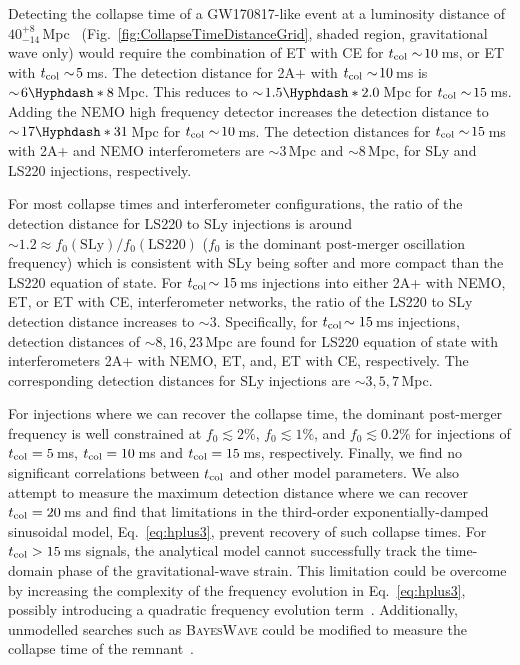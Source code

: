 \documentclass[../Thesis.tex]{subfiles}
\begin{document}
    Detecting the collapse time of a GW170817-like event at a luminosity distance of $40^{+8}_{-14}$\,Mpc~\cite{GW170817multi} (Fig.~\ref{fig:CollapseTimeDistanceGrid}, shaded region, gravitational wave only) would require the combination of ET with CE for $t_{\mathrm{col}} \sim\!10$\,ms,  or ET with $t_{\mathrm{col}} \sim\!5$\,ms. 
    The detection distance for 2A+ with  $t_{\mathrm{col}}\sim\!10$\,ms is $\sim\!6\Hyphdash*8$\,Mpc.  
    This reduces to $\sim\!1.5\Hyphdash*2.0$\,Mpc for $t_{\mathrm{col}} \sim\!15$\,ms. 
    Adding the NEMO high frequency detector increases the detection distance to $\sim\!17\Hyphdash*31$\,Mpc  for $t_{\mathrm{col}} \sim\!10$\,ms.
    The detection distances for $t_{\mathrm{col}}\sim\!15$\,ms with 2A+ and NEMO interferometers are $\sim\!3$\,Mpc and $\sim\!8$\,Mpc, for SLy and LS220 injections, respectively.\par
    
    
    For most collapse times and interferometer configurations, the ratio of the detection distance for LS220 to SLy injections is around $\sim\!1.2\approx f_0(\mathrm{SLy}) / f_0(\mathrm{LS220})$ ($f_0$ is the dominant post-merger oscillation frequency) which is consistent with SLy being softer and more compact than the LS220 equation of state. 
    For $t_{\mathrm{col}}\!\sim15$\,ms injections into either 2A+ with NEMO, ET, or ET with CE, interferometer networks, the ratio of the LS220 to SLy detection distance increases to $\sim\!3$.
    Specifically, for $t_{\mathrm{col}}\!\sim15$\,ms injections, detection distances of $\sim\!8,16,23$\,Mpc are found for LS220 equation of state with interferometers 2A+ with NEMO, ET, and, ET with CE, respectively.
    The corresponding detection distances for SLy injections are $\sim\!3,5,7$\,Mpc. 
    \par
    For injections where we can recover the collapse time, the dominant post-merger frequency is well constrained at $f_0 \lesssim 2\%$, $f_0 \lesssim 1\%$, and $f_0 \lesssim 0.2\%$ for injections of $t_{\mathrm{col}}=5$\,ms, $t_{\mathrm{col}}=10$\,ms and $t_{\mathrm{col}}=15$\,ms, respectively. 
    Finally, we find no significant correlations between $t_{\mathrm{col}}$ and other model parameters.
    We also attempt to measure the maximum detection distance where we can recover $t_{\mathrm{col}}=20$\,ms and find that limitations in the third-order exponentially-damped sinusoidal model, Eq.~\ref{eq:hplus3}, prevent recovery of such collapse times.
    For $t_{\mathrm{col}} > 15$\,ms signals, the analytical model cannot successfully track the time-domain phase of the gravitational-wave strain.
    This limitation could be overcome by increasing the complexity of the frequency evolution in Eq.~\ref{eq:hplus3}, possibly introducing a quadratic frequency evolution term~\cite{Bose2018}.
    Additionally, unmodelled searches such as \textsc{BayesWave} could be modified to measure the collapse time of the remnant~\cite{Cornish2015,Littenberg2015,Chatziioannou2017,Torres-Rivas2019}.\par
\vspace{-0.25cm}
\end{document}
